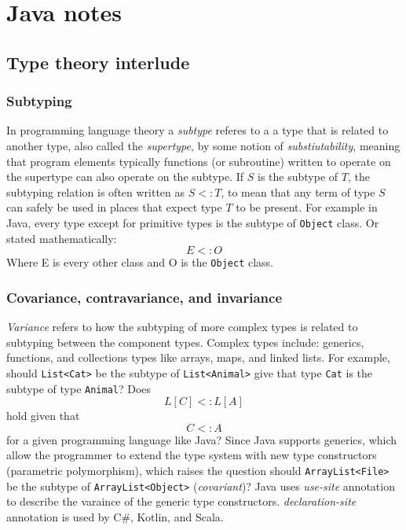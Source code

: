 \documentclass[a4paper]{article}
\begin{document}
\section*{Java notes}

\subsection*{Type theory interlude}

\subsubsection*{Subtyping}

In programming language theory a \emph{subtype} referes to a a type that is related to another type, also called the 
\emph{supertype}, by some notion of \emph{substiutability}, meaning that program elements typically functions (or subroutine)
written to operate on the supertype can also operate on the subtype. If \(S\) is the subtype of \(T\), the subtyping relation
is often written as \(S <: T\), to mean that any term of type \(S\) can safely be used in places that expect type \(T\) to be
present. For example in Java, every type except for primitive types is the subtype of \lstinline{Object} class. Or stated
mathematically:
\[
E <: O  
\]
Where E is every other class and O is the \lstinline{Object} class. 

\subsubsection*{Covariance, contravariance, and invariance}
\emph{Variance} refers to how the subtyping of more complex types is related to subtyping between the component types.
Complex types include: generics, functions, and collections types like arrays, maps, and linked lists. For example, 
should \lstinline{List<Cat>} be the subtype of \lstinline{List<Animal>} give that type \lstinline{Cat} is the subtype of type \lstinline{Animal}? Does
\[L[C] <: L[A]\] hold given that \[C <: A\] for a given programming language like Java? Since Java supports generics, which
allow the programmer to extend the type system with new type constructors (parametric polymorphism), which raises the question
should \lstinline{ArrayList<File>} be the subtype of \lstinline{ArrayList<Object>} (\emph{covariant})? Java uses 
\emph{use-site}  annotation to describe the varaince of the generic type constructors. \emph{declaration-site} annotation is
used by C\#, Kotlin, and Scala. 
\end{document}
